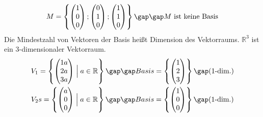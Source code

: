 \begin{gather*}
  M = \left\{\begin{pmatrix}1 \\ 0 \\ 0\end{pmatrix}; \begin{pmatrix}0 \\ 1 \\ 0\end{pmatrix}; \begin{pmatrix}1 \\ 1 \\ 0\end{pmatrix}\right\} \gap\gap \text{$M$ ist keine Basis}
\end{gather*}
Die Mindestzahl von Vektoren der Basis heißt Dimension des Vektorraums. $\mathbb{R}^3$ ist ein 3-dimensionaler Vektorraum.
\begin{gather*}
  V_1 = \left\{\begin{pmatrix}1a \\ 2a \\ 3a\end{pmatrix} \Bigm| a \in \mathbb{R}\right\} \gap\gap Basis = \left\{\begin{pmatrix}1 \\ 2 \\ 3\end{pmatrix}\right\} \gap\text{(1-dim.)} \\
  V_2s = \left\{\begin{pmatrix}a \\ 0 \\ 0\end{pmatrix} \Bigm| a \in \mathbb{R}\right\} \gap\gap Basis = \left\{\begin{pmatrix}1 \\ 0 \\ 0\end{pmatrix}\right\} \gap\text{(1-dim.)}
\end{gather*}
\newpage
